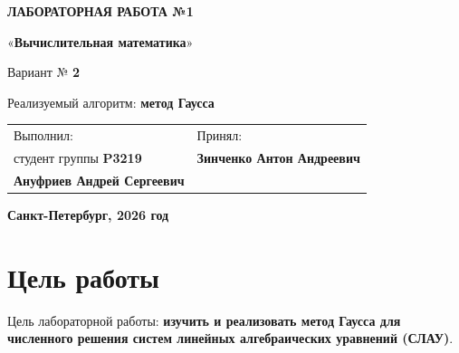 \documentclass[a4paper,12pt]{article}
\begin{document}
\begin{center}
    {\Large \textbf{ЛАБОРАТОРНАЯ РАБОТА №1}}

    \vspace{0.3cm}

    {\large «\textbf{Вычислительная математика}»}

    \vspace{0.3cm}

    {\normalsize Вариант № \textbf{2}}

    \vspace{0.3cm}

    {\normalsize Реализуемый алгоритм: \textbf{метод Гаусса}}

    \vspace{1cm}

    \begin{tabular}{p{}p{}}
        Выполнил: & Принял: \\
        студент группы \textbf{P3219} & \textbf{Зинченко Антон Андреевич} \\
        \textbf{Ануфриев Андрей Сергеевич} & \\
    \end{tabular}

    \vspace{1cm}

    \textbf{Санкт-Петербург, 2026 год}
\end{center}


\tableofcontents

\newpage

\section{Цель работы}

Цель лабораторной работы: \textbf{изучить и реализовать метод Гаусса для численного решения систем линейных алгебраических уравнений (СЛАУ)}.
\end{document}
